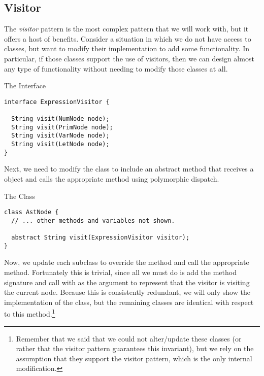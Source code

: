 \subsection{Visitor}

The \emph{visitor} pattern is the most complex pattern that we will work with, but it offers a host of benefits. Consider a situation in which we do not have access to classes, but want to modify their implementation to add some functionality. In particular, if those classes support the use of visitors, then we can design almost any type of functionality without needing to modify those classes at all.


\begin{cl}[]{The  Interface}
\begin{lstlisting}[language=MyJava]
interface ExpressionVisitor {
  
  String visit(NumNode node);
  String visit(PrimNode node);
  String visit(VarNode node);
  String visit(LetNode node);
}
\end{lstlisting}
\end{cl}

Next, we need to modify the  class to include an abstract  method that receives a  object and calls the appropriate  method using polymorphic dispatch. 

\begin{cl}[]{The  Class}
\begin{lstlisting}[language=MyJava]
class AstNode {
  // ... other methods and variables not shown.

  abstract String visit(ExpressionVisitor visitor);
}
\end{lstlisting}
\end{cl}

Now, we update each subclass to override the  method and call the appropriate  method. Fortunately this is trivial, since all we must do is add the method signature and call  with  as the argument to represent that the visitor is visiting the current node. Because this is consistently redundant, we will only show the implementation of the  class, but the remaining classes are identical with respect to this method.\footnote{Remember that we said that we could not alter/update these classes (or rather that the visitor pattern guarantees this invariant), but we rely on the assumption that they support the visitor pattern, which is the only internal modification.}

